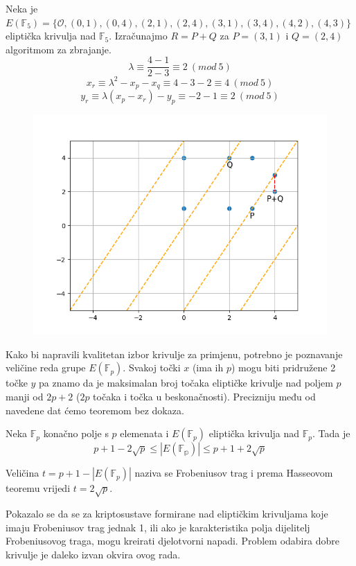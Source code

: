 \documentclass{mathos}
\begin{document}
\begin{primjer}
    Neka je $E(\mathbb{F}_5) = \{ \mathcal{O}, (0, 1), (0, 4), (2, 1), (2, 4), (3, 1), (3, 4), (4,2), (4, 3) \}$ eliptička krivulja nad $\mathbb{F}_5$. 
    Izračunajmo $R = P + Q$ za $P = (3, 1)$ i $Q = (2, 4)$ algoritmom za zbrajanje.
    \[ \lambda \equiv \frac{4 - 1}{2 - 3} \equiv 2 \ (mod\  5)\]
    \[ x_r \equiv \lambda^2 - x_p - x_q \equiv 4 - 3 - 2 \equiv 4 \  (mod\  5)  \]
    \[ y_r \equiv \lambda(x_p - x_r) - y_p \equiv -2 - 1 \equiv 2 \  (mod\  5) \]
    \begin{figure}[H]
        \centering
        \includegraphics[width=0.8\linewidth,keepaspectratio]{7.png}
    \end{figure}
\end{primjer}

Kako bi napravili kvalitetan izbor krivulje za primjenu, potrebno je poznavanje veličine reda grupe $E(\mathbb{F}_p)$. Svakoj točki $x$ (ima ih $p$) mogu biti pridružene 2 točke $y$ pa znamo da je maksimalan broj točaka eliptičke krivulje nad poljem $p$ manji od $2p + 2$ ($2p$ točaka i točka u beskonačnosti). Precizniju među od navedene dat ćemo teoremom bez dokaza.
\begin{theorem}[Hasse]
    Neka $\mathbb{F}_p$ konačno polje s $p$ elemenata i $E(\mathbb{F}_p)$ eliptička krivulja nad $\mathbb{F}_p$. Tada je
    \[ p + 1 - 2 \sqrt{p} \leq |E(\mathbb{F_p})| \leq p + 1 + 2 \sqrt{p} \]
\end{theorem}
\begin{nap}
    Veličina $t = p + 1 - |E(\mathbb{F}_p)|$ naziva se Frobeniusov trag i prema Hasseovom teoremu vrijedi $t = 2 \sqrt{p}$.
\end{nap}

Pokazalo se da se za kriptosustave formirane nad eliptičkim krivuljama koje imaju Frobeniusov trag jednak 1, ili ako je karakteristika polja dijelitelj Frobeniusovog traga, mogu kreirati djelotvorni napadi. Problem odabira dobre krivulje je daleko izvan okvira ovog rada.
\end{document}
